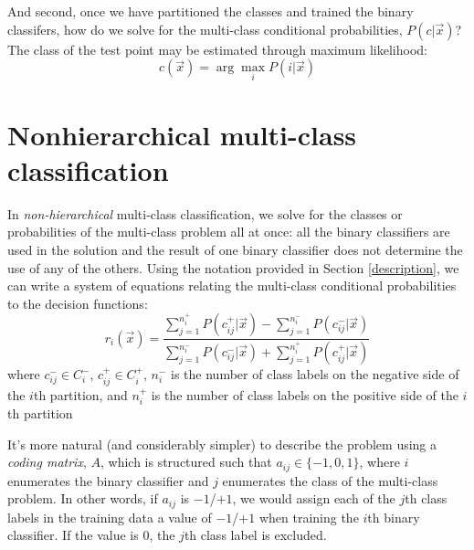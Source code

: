 \documentclass{article}
\begin{document}
And second, once we have partitioned the classes
and trained the binary classifers,
how do we solve for the multi-class conditional probabilities, $P(c|\vec x)$?
The class of the test point may be estimated through maximum likelihood:
\begin{equation}
	c(\vec x)=\arg \max_i P(i | \vec x)
	\label{maximum_likelihood}
\end{equation}



\section{Nonhierarchical multi-class classification}

In {\it non-hierarchical} multi-class classification, we solve for the
classes or probabilities of the multi-class problem all at once:
all the binary classifiers are used in the solution and the result of
one binary classifier does not determine the use of any of the others.
Using the notation provided in Section \ref{description}, 
we can write a system of equations relating
the multi-class conditional probabilities to the decision
functions:
\begin{equation}
	r_i(\vec x) = \frac{\sum_{j=1}^{n_i^+} P(c_{ij}^+|\vec x) - \sum_{j=1}^{n_{i}^-} P(c_{ij}^-|\vec x)}{\sum_{j=1}^{n_i^-} P(c_{ij}^-|\vec x) + \sum_{j=1}^{n_i^+} P(c_{ij}^+|\vec x)}
	\label{decision_function}
\end{equation}
where 
$c_{ij}^- \in C_i^-$,
$c_{ij}^+ \in C_i^+$,
$n_i^-$ is the number of class labels on the negative side of
the $i$th partition,
and $n_i^+$ is the number of class labels on the positive side of
the $i$th partition

It's more natural (and considerably simpler) to describe the problem using a
{\it coding matrix}, $A$, 
which is structured such that
$a_{ij} \in \lbrace -1, 0, 1 \rbrace$, 
where $i$ enumerates the binary classifier and
$j$ enumerates the class of the multi-class problem.
In other words, if $a_{ij}$ is $-1$/$+1$, we would assign each of the $j$th class
labels in the training data a value of $-1$/$+1$ when training the $i$th
binary classifier. If the value is $0$, the $j$th class label is excluded.
\citep{Dietterich_Bakiri1995,Windeatt_Ghaderi2002}
\end{document}
